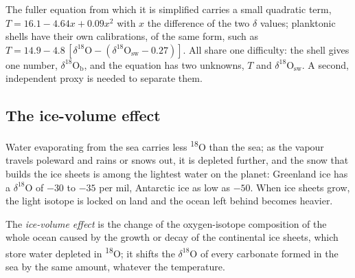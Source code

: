 The fuller equation from which it is simplified carries a small quadratic term,
$T = 16.1 - 4.64x + 0.09x^2$ with $x$ the difference of the two $\delta$ values; planktonic shells
have their own calibrations, of the same form, such as $T = 14.9 - 4.8\,[\delta^{18}\mathrm{O} -
(\delta^{18}\mathrm{O}_{\mathrm{sw}} - 0.27)]$. All share one difficulty: the shell gives one
number, $\delta^{18}\mathrm{O}_{\mathrm{b}}$, and the equation has two unknowns, $T$ and
$\delta^{18}\mathrm{O}_{\mathrm{sw}}$. A second, independent proxy is needed to separate them.

\subsection*{The ice-volume effect}

Water evaporating from the sea carries less \textsuperscript{18}O than the sea; as the vapour
travels poleward and rains or snows out, it is depleted further, and the snow that builds the ice
sheets is among the lightest water on the planet: Greenland ice has a $\delta^{18}$O of $-30$ to $-35$
per mil, Antarctic ice as low as $-50$. When ice sheets grow, the light isotope is locked on land
and the ocean left behind becomes heavier.

\begin{definition}\label{def:b2:climate-proxies:ice-volume}
The \emph{ice-volume effect} is the change of the oxygen-isotope
composition of the whole ocean caused by the growth or decay of the continental ice sheets, which
store water depleted in \textsuperscript{18}O; it shifts the $\delta^{18}$O of every carbonate
formed in the sea by the same amount, whatever the temperature.
\end{definition}

